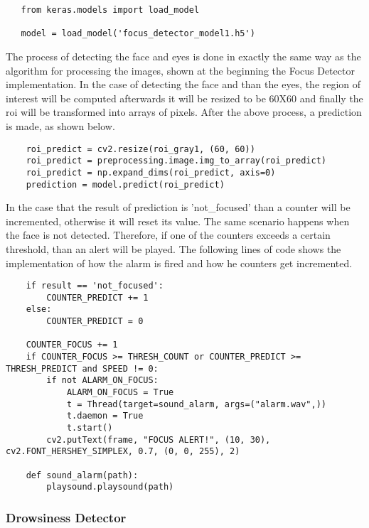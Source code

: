\begin{lstlisting}
   from keras.models import load_model
   
   model = load_model('focus_detector_model1.h5')
\end{lstlisting}

The process of detecting the face and eyes is done in exactly the same way as the algorithm for processing the images, shown at the beginning the Focus Detector implementation. In the case of detecting the face and than the eyes, the region of interest will be computed afterwards it will be resized to be 60X60 and finally the roi will be transformed into arrays of pixels. After the above process, a prediction is made, as shown below.

\begin{lstlisting}
    roi_predict = cv2.resize(roi_gray1, (60, 60))
    roi_predict = preprocessing.image.img_to_array(roi_predict)
    roi_predict = np.expand_dims(roi_predict, axis=0)
    prediction = model.predict(roi_predict)
\end{lstlisting}

In the case that the result of prediction is 'not\_focused' than a counter will be incremented, otherwise it will reset its value. The same scenario happens when the face is not detected. Therefore, if one of the counters exceeds a certain threshold, than an alert will be played. The following lines of code shows the implementation of how the alarm is fired and how he counters get incremented.

\begin{lstlisting}
    if result == 'not_focused':
        COUNTER_PREDICT += 1
    else:
        COUNTER_PREDICT = 0
        
    COUNTER_FOCUS += 1
    if COUNTER_FOCUS >= THRESH_COUNT or COUNTER_PREDICT >= THRESH_PREDICT and SPEED != 0:
        if not ALARM_ON_FOCUS:
            ALARM_ON_FOCUS = True
            t = Thread(target=sound_alarm, args=("alarm.wav",))
            t.daemon = True
            t.start()
        cv2.putText(frame, "FOCUS ALERT!", (10, 30), cv2.FONT_HERSHEY_SIMPLEX, 0.7, (0, 0, 255), 2)
        
    def sound_alarm(path):
        playsound.playsound(path)         
\end{lstlisting}

\subsubsection{Drowsiness Detector}

